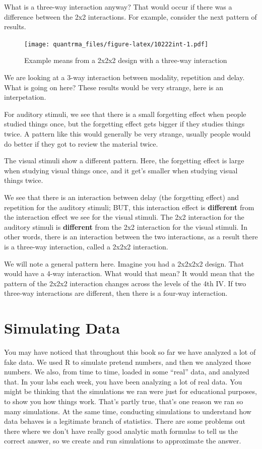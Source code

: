 \documentclass[
]{book}
\begin{document}
What is a three-way interaction anyway? That would occur if there was a difference between the 2x2 interactions. For example, consider the next pattern of results.

\begin{figure}
\centering
\texttt{[image: quantrma\_files/figure-latex/10222int-1.pdf]}
\caption{\label{fig:10222int}Example means from a 2x2x2 design with a three-way interaction}
\end{figure}

We are looking at a 3-way interaction between modality, repetition and delay. What is going on here? These results would be very strange, here is an interpetation.

For auditory stimuli, we see that there is a small forgetting effect when people studied things once, but the forgetting effect gets bigger if they studies things twice. A pattern like this would generally be very strange, usually people would do better if they got to review the material twice.

The visual stimuli show a different pattern. Here, the forgetting effect is large when studying visual things once, and it get's smaller when studying visual things twice.

We see that there is an interaction between delay (the forgetting effect) and repetition for the auditory stimuli; BUT, this interaction effect is \textbf{different} from the interaction effect we see for the visual stimuli. The 2x2 interaction for the auditory stimuli is \textbf{different} from the 2x2 interaction for the visual stimuli. In other words, there is an interaction between the two interactions, as a result there is a three-way interaction, called a 2x2x2 interaction.

We will note a general pattern here. Imagine you had a 2x2x2x2 design. That would have a 4-way interaction. What would that mean? It would mean that the pattern of the 2x2x2 interaction changes across the levels of the 4th IV. If two three-way interactions are different, then there is a four-way interaction.

\hypertarget{simulating-data}{%
\chapter{Simulating Data}\label{simulating-data}}

You may have noticed that throughout this book so far we have analyzed a lot of fake data. We used R to simulate pretend numbers, and then we analyzed those numbers. We also, from time to time, loaded in some ``real'' data, and analyzed that. In your labs each week, you have been analyzing a lot of real data. You might be thinking that the simulations we ran were just for educational purposes, to show you how things work. That's partly true, that's one reason we ran so many simulations. At the same time, conducting simulations to understand how data behaves is a legitimate branch of statistics. There are some problems out there where we don't have really good analytic math formulas to tell us the correct answer, so we create and run simulations to approximate the answer.
\end{document}
